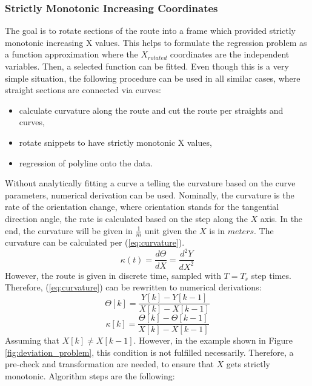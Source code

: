 \documentclass[sn-mathphys-num]{sn-jnl}%
\begin{document}
\subsubsection{Strictly Monotonic Increasing Coordinates}
The goal is to rotate sections of the route into a frame which provided strictly monotonic increasing X values. This helps to formulate the regression
problem as a function approximation where the $X_{rotated}$ coordinates are the independent variables. Then, a selected function can be fitted.
Even though this is a very 
simple situation, the following procedure can be used in all similar cases, where straight sections are connected via curves:
\begin{itemize}
    \item calculate curvature along the route and cut the route per straights and curves,
    \item rotate snippets to have strictly monotonic X values,
    \item regression of polyline onto the data.
\end{itemize}
Without analytically fitting a curve a telling the curvature based on the curve parameters, numerical derivation can be used.
Nominally, the curvature is the rate of the orientation change, where orientation stands for the tangential direction angle, the rate is calculated based on the step along 
the $X$ axis. In the end, the curvature will be given in $\frac{1}{m}$ unit given the $X$ is in $meters$. The curvature can be calculated per (\ref{eq:curvature}).
\begin{equation} \label{eq:curvature}
    \kappa(t) = \frac{d\Theta}{dX} = \frac{d^2Y}{dX^2}
\end{equation} 
However, the route is given in discrete time, sampled with $T=T_s$ step times. Therefore, (\ref{eq:curvature}) can be rewritten to numerical derivations:
\begin{equation} \label{eq:discrete_orientation}
    \Theta[k] = \frac{Y[k]-Y[k-1]}{X[k]-X[k-1]}
\end{equation}
\begin{equation} \label{eq:discrete_curvature}
    \kappa[k] = \frac{\Theta[k]-\Theta[k-1]}{X[k]-X[k-1]}
\end{equation}
Assuming that $X[k] \neq X[k-1]$. However, in the example shown in Figure \ref{fig:deviation_problem}, this condition is not fulfilled necessarily. Therefore, a pre-check and 
transformation are needed, to ensure that $X$ gets strictly monotonic. Algorithm steps are the following:
\end{document}
